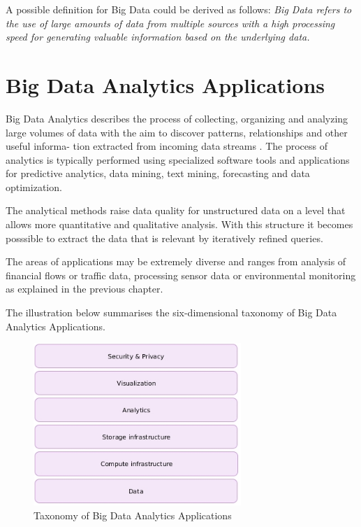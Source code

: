 A possible definition for Big Data could be derived as follows: \textit{Big Data refers to the use
of large amounts of data from multiple sources with a high processing speed for generating
valuable information based on the underlying data.}

\section{Big Data Analytics Applications}

Big Data Analytics describes the process of collecting, organizing and analyzing large
volumes of data with the aim to discover patterns, relationships and other useful informa-
tion extracted from incoming data streams \cite{Marz15}. The process of analytics is typically
performed using specialized software tools and applications for predictive analytics, data
mining, text mining, forecasting and data optimization.

The analytical methods raise data quality for unstructured data on a level that allows
more quantitative and qualitative analysis. With this structure it becomes posssible
to extract the data that is relevant by iteratively refined queries.

The areas of applications may be extremely diverse and ranges from analysis of financial
flows or traffic data, processing sensor data or environmental monitoring as explained in
the previous chapter.

The illustration below summarises the six-dimensional taxonomy \cite{Bitk14, Csa14} of Big
Data Analytics Applications.
\begin{figure}[H]
	\centering
	\includegraphics[width=0.7\textwidth]{../images/05-big-data-taxonomy.jpg}
	\caption{Taxonomy of Big Data Analytics Applications \cite{Bitk14, Csa14}}
	\label{taxonomy-bigdata-applications}
\end{figure}

